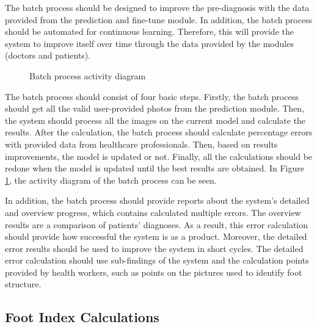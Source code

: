 The batch process should be designed to improve the pre-diagnosis with the data provided from the prediction and fine-tune module. In addition, the batch process should be automated for continuous learning. Therefore, this will provide the system to improve itself over time through the data provided by the modules (doctors and patients). 

\begin{figure}[htbp]
\centering
{}
\caption{Batch process activity diagram}
\label{fig:BatchProcessActivityDiagram}
\end{figure}

The batch process should consist of four basic steps. Firstly, the batch process should get all the valid user-provided photos from the prediction module. Then, the system should process all the images on the current model and calculate the results. After the calculation, the batch process should calculate percentage errors with provided data from healthcare professionals. Then, based on results improvements, the model is updated or not. Finally, all the calculations should be redone when the model is updated until the best results are obtained. In Figure \ref{fig:BatchProcessActivityDiagram}, the activity diagram of the batch process can be seen.

In addition, the batch process should provide reports about the system's detailed and overview progress, which contains calculated multiple errors. The overview results are a comparison of patients' diagnoses. As a result, this error calculation should provide how successful the system is as a product. Moreover, the detailed error results should be used to improve the system in short cycles. The detailed error calculation should use sub-findings of the system and the calculation points provided by health workers, such as points on the pictures used to identify foot structure. 

\subsection{ Foot Index Calculations }

